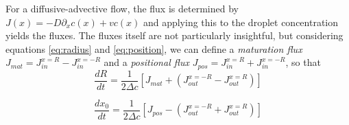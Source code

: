 \documentclass{Dissertate}
\begin{document}
For a diffusive-advective flow, the flux is determined by
\(J(x) = -D\partial_xc(x)+vc(x)\) and applying this to the droplet
concentration yields the fluxes. The fluxes itself are not particularly
insightful, but considering equations \ref{eq:radius} and
\ref{eq:position}, we can define a \emph{maturation flux}
\(J_{mat} = J_{in}^{x=R}-J_{in}^{x=-R}\) and a \emph{positional flux}
\(J_{pos} = J_{in}^{x=R}+J_{in}^{x=-R}\), so that \begin{equation}
\frac{dR}{dt}=\frac{1}{2\Delta c}\left[J_{mat}+(J_{out}^{x=-R}-J_{out}^{x=R})\right]
\label{eq:drdtalt}\end{equation}

\begin{equation}
\frac{dx_0}{dt}=\frac{1}{2\Delta c}\left[J_{pos}-(J_{out}^{x=-R}+J_{out}^{x=R})\right]
\label{eq:dxdtalt}\end{equation}
\end{document}
